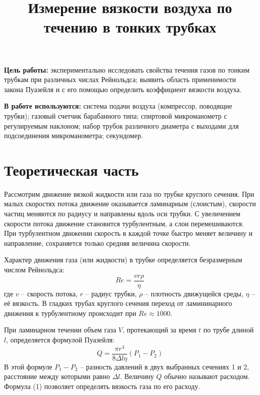 \documentclass[a4paper, 12pt]{article}
\author{}
\title{Измерение вязкости воздуха по течению в тонких трубках}
\date{}
\begin{document}
\maketitle
\textbf{Цель работы:} экспериментально исследовать свойства течения газов по тонким трубкам при различных числах Рейнольдса; выявить область применимости закона Пуазейля и с его помощью определить коэффициент вязкости воздуха.\hfill
\break
	
\textbf{В работе используются:} система подачи воздуха (компрессор, поводящие трубки); газовый счетчик барабанного типа; спиртовой микроманометр с регулируемым наклоном; набор трубок различного диаметра с выходами для подсоединения микроманометра; секундомер.


\section{Теоретическая часть}
Рассмотрим движение вязкой жидкости или газа по трубке круглого сечения. При малых скоростях потока движение оказывается ламинарным (слоистым), скорости частиц меняются по радиусу и направлены вдоль оси трубки. С увеличением скорости потока движение становится турбулентным, а слои перемешиваются. При турбулентном движении скорость в каждой точке быстро меняет величину и направление, сохраняется только средняя величина скорости.

Характер движения газа (или жидкости) в трубке определяется безразмерным числом Рейнольдса:
\[
	Re = \frac{vr\rho}{\eta}
\]
где $v$ -- скорость потока, $r$ -- радиус трубки, $\rho$ -- плотность движущейся среды, $\eta$ -- её вязкость. В гладких трубах круглого сечения переход от ламининарного движения к турбулентному происходит при $Re \approx 1000$.

При ламинарном течении объем газа $V$, протекающий за время $t$ по трубе длиной $l$, определяется формулой Пуазейля:
\begin{equation}
	Q = \frac{\pi r^4}{8 \Delta l \eta}(P_1 - P_2)
\end{equation}
В этой формуле $P_1 - P_2$ -- разность давлений в двух выбранных сечениях 1 и 2, расстояние между которыми равно $\Delta l$. Величину $Q$ обычно называют расходом. Формула (1) позволяет определять вязкость газа по его расходу.
\end{document}
